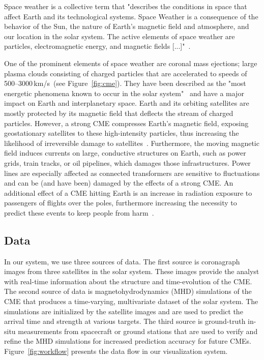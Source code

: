 \documentclass[journal]{vgtc}                %
\begin{document}
Space weather is a collective term that "describes the conditions in space that affect Earth and its technological systems. Space Weather is a consequence of the behavior of the Sun, the nature of Earth’s magnetic field and atmosphere, and our location in the solar system. The active elements of space weather are particles, electromagnetic energy, and magnetic fields [...]"~\cite{noaaprofile}.

One of the prominent elements of space weather are coronal mass ejections; large plasma clouds consisting of charged particles that are accelerated to speeds of 500--3000\,km/s~(see Figure~\ref{fig:cme}). They have been described as the "most energetic phenomena known to occur in the solar system"~\cite{Kahler:1987jt} and have a major impact on Earth and interplanetary space. Earth and its orbiting satellites are mostly protected by its magnetic field that deflects the stream of charged particles. However, a strong CME compresses Earth's magnetic field, exposing geostationary satellites to these high-intensity particles, thus increasing the likelihood of irreversible damage to satellites~\cite{Guhathakurta:2013cl}. Furthermore, the moving magnetic field induces currents on large, conductive structures on Earth, such as power grids, train tracks, or oil pipelines, which damages those infrastructures. Power lines are especially affected as connected transformers are sensitive to fluctuations and can be (and have been) damaged by the effects of a strong CME. An additional effect of a CME hitting Earth is an increase in radiation exposure to passengers of flights over the poles, furthermore increasing the necessity to predict these events to keep people from harm~\cite{Matthia:2009en}.

\subsection{Data} \label{sec:data}
In our system, we use three sources of data. The first source is coronagraph images from three satellites in the solar system. These images provide the analyst with real-time information about the structure and time-evolution of the CME. The second source of data is magnetohydrodynamics (MHD) simulations of the CME that produces a time-varying, multivariate dataset of the solar system. The simulations are initialized by the satellite images and are used to predict the arrival time and strength at various targets. The third source is ground-truth in-situ measurements from spacecraft or ground stations that are used to verify and refine the MHD simulations for increased prediction accuracy for future CMEs. Figure~\ref{fig:workflow} presents the data flow in our visualization system.
\end{document}
